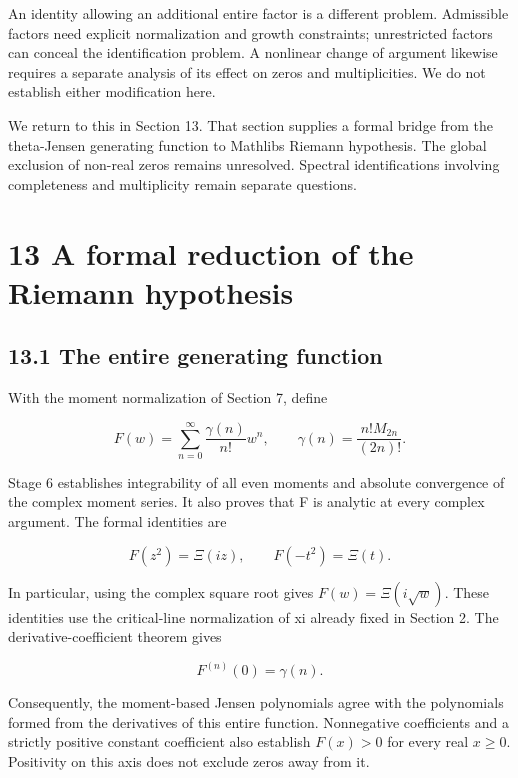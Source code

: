 \documentclass[
  11pt,
]{article}
\begin{document}
An identity allowing an additional entire factor is a different problem. Admissible factors need explicit normalization and growth constraints; unrestricted factors can conceal the identification problem. A nonlinear change of argument likewise requires a separate analysis of its effect on zeros and multiplicities. We do not establish either modification here.

We return to this in Section 13. That section supplies a formal bridge from the theta-Jensen generating function to Mathlib\textquotesingle s Riemann hypothesis. The global exclusion of non-real zeros remains unresolved. Spectral identifications involving completeness and multiplicity remain separate questions.

\hypertarget{a-formal-reduction-of-the-riemann-hypothesis}{%
\section{13 A formal reduction of the Riemann hypothesis}\label{a-formal-reduction-of-the-riemann-hypothesis}}

\hypertarget{the-entire-generating-function}{%
\subsection{13.1 The entire generating function}\label{the-entire-generating-function}}

With the moment normalization of Section 7, define

\[F(w) = \sum_{n = 0}^{\infty}\frac{\gamma(n)}{n!}w^{n},\quad\quad\gamma(n) = \frac{n!M_{2n}}{(2n)!}.\]

Stage 6 establishes integrability of all even moments and absolute convergence of the complex moment series. It also proves that F is analytic at every complex argument. The formal identities are

\[F\left( z^{2} \right) = \Xi(iz),\quad\quad F\left( - t^{2} \right) = \Xi(t).\]

In particular, using the complex square root gives \(F(w) = \Xi\left( i\sqrt{w} \right)\). These identities use the critical-line normalization of xi already fixed in Section 2. The derivative-coefficient theorem gives

\[F^{(n)}(0) = \gamma(n).\]

Consequently, the moment-based Jensen polynomials agree with the polynomials formed from the derivatives of this entire function. Nonnegative coefficients and a strictly positive constant coefficient also establish \(F(x) > 0\) for every real \(x \geq 0\). Positivity on this axis does not exclude zeros away from it.
\end{document}
